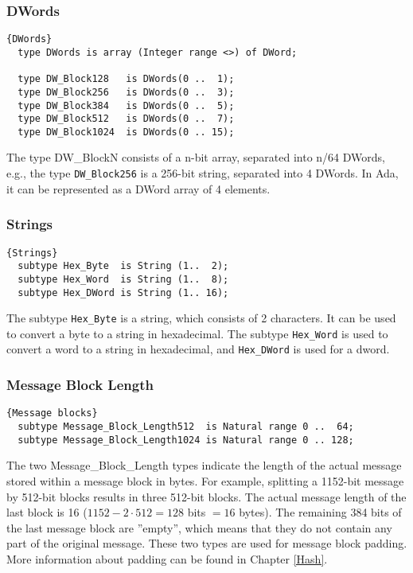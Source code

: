 \hhline
\subsubsection*{DWords}
\begin{lstlisting}{DWords}
  type DWords is array (Integer range <>) of DWord;
  
  type DW_Block128   is DWords(0 ..  1);
  type DW_Block256   is DWords(0 ..  3);
  type DW_Block384   is DWords(0 ..  5);
  type DW_Block512   is DWords(0 ..  7);
  type DW_Block1024  is DWords(0 .. 15);
\end{lstlisting}
The type DW\_BlockN consists of a n-bit array, separated into n/64
DWords, e.g., the type \texttt{DW\_Block256} is a 256-bit string,
separated into 4 DWords. In Ada, it can be represented as a DWord
array of 4 elements.

\hhline

\subsubsection*{Strings}
\begin{lstlisting}{Strings}
  subtype Hex_Byte  is String (1..  2);
  subtype Hex_Word  is String (1..  8);
  subtype Hex_DWord is String (1.. 16);
\end{lstlisting}
The subtype \texttt{Hex\_Byte} is a string, which consists of 2
characters. It can be used to convert a byte to a string in
hexadecimal. The subtype \texttt{Hex\_Word} is used to convert a word
to a string in hexadecimal, and \texttt{Hex\_DWord} is used for a
dword.

\hhline
\subsubsection*{Message Block Length}
\begin{lstlisting}{Message blocks}
  subtype Message_Block_Length512  is Natural range 0 ..  64;
  subtype Message_Block_Length1024 is Natural range 0 .. 128;
\end{lstlisting}
The two Message\_Block\_Length types indicate the length of the actual
message stored within a message block in bytes. For example, splitting
a 1152-bit message by 512-bit blocks results in three 512-bit
blocks. The actual message length of the last block is 16 ($1152 - 2
\cdot 512 = 128$ bits $= 16$ bytes).  The remaining 384 bits of the
last message block are ''empty'', which means that they do not contain
any part of the original message. These two types are used for message
block padding.  More information about padding can be found in Chapter
\ref{Hash}.

